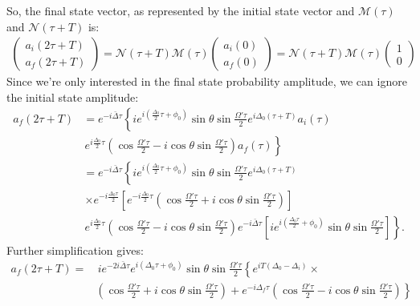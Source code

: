 \documentclass{article}
\begin{document}
So, the final state vector, as represented by the initial state vector and $\mathcal{M}(\tau)$ and $\mathcal{N}(\tau+T)$ is:
\begin{align}
\begin{pmatrix}
a_i(2\tau+T)\\a_f(2\tau+T)
\end{pmatrix}=
\mathcal{N}(\tau + T)\mathcal{M}(\tau)
\begin{pmatrix}
a_i(0) \\a_f(0)
\end{pmatrix} = 
\mathcal{N}(\tau + T)\mathcal{M}(\tau)
\begin{pmatrix}
1 \\ 0
\end{pmatrix}
\end{align}
Since we're only interested in the final state probability amplitude, we can ignore the initial state amplitude:
\begin{align}
a_f(2\tau + T) &= e^{-i\bar{\Delta}\tau}\left\{ie^{i\left( \frac{\Delta_0}{2}\tau + \phi_0\right) }\sin\theta\sin\frac{\Omega'\tau}{2}e^{i\Delta_0(\tau+T)}a_i(\tau)\right.\nonumber\\ 
&{\,}\left. e^{i\frac{\Delta_0}{2}\tau}\left(\cos\frac{\Omega'\tau}{2}-i\cos\theta\sin\frac{\Omega'\tau}{2} \right)a_f(\tau)\right\}\nonumber\\
&= e^{-i\bar{\Delta}\tau}\left\{ie^{i\left( \frac{\Delta_0}{2}\tau + \phi_0\right) }\sin\theta\sin\frac{\Omega'\tau}{2}e^{i\Delta_0(\tau+T)}\right.\nonumber\\&{\,}\left.\times e^{-i\frac{\Delta_0\tau}{2}}\left[ e^{-i\frac{\Delta_0}{2}\tau}\left(\cos\frac{\Omega'\tau}{2} + i\cos\theta\sin\frac{\Omega'\tau}{2} \right) \right]\right.\nonumber\\
&{\,}\left. e^{i\frac{\Delta_0}{2}\tau}\left(\cos\frac{\Omega'\tau}{2}-i\cos\theta\sin\frac{\Omega'\tau}{2} \right) e^{-i\bar{\Delta}\tau}\left[ie^{i\left(\frac{\Delta_0\tau}{2} + \phi_0 \right) }\sin\theta\sin\frac{\Omega'\tau}{2} \right]
\right\}.
\end{align}
Further simplification gives:
\begin{align}
a_f(2\tau+T) = &{\,}ie^{-2i\bar{\Delta}\tau}e^{i(\Delta_0\tau + \phi_0)}\sin\theta\sin\frac{\Omega'\tau}{2}\left\{e^{iT(\Delta_0-\Delta_i)}\times\right.\nonumber\\&\left.
\left(\cos\frac{\Omega'\tau}{2}+i\cos\theta\sin\frac{\Omega'\tau}{2} \right) + e^{-i\Delta_f\tau}\left(\cos\frac{\Omega'\tau}{2}-i\cos\theta\sin\frac{\Omega'\tau}{2} \right) \right\}
\end{align}
\end{document}
